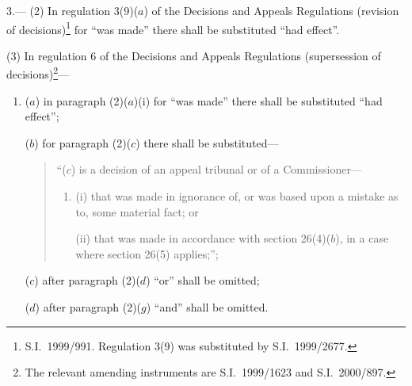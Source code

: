\documentclass[12pt,a4paper]{article}
\begin{document}
3.---%
%
%
(2) In regulation 3(9)($a$)  of the Decisions and Appeals Regulations (revision of decisions)\footnote{S.I.\ 1999/991. Regulation 3(9) was substituted by S.I.\ 1999/2677.} for “was made” there shall be substituted “had effect”.

(3) In regulation 6 of the Decisions and Appeals Regulations (supersession of decisions)\footnote{The relevant amending instruments are S.I.\ 1999/1623 and S.I.\ 2000/897.}—
\begin{enumerate}\item[]
($a$) in paragraph (2)($a$)(i)  for “was made” there shall be substituted “had effect”;

($b$) for paragraph (2)($c$)  there shall be substituted—
\begin{quotation}
“($c$) is a decision of an appeal tribunal or of a Commissioner—
\begin{enumerate}\item[]
(i) that was made in ignorance of, or was based upon a mistake as to, some material fact; or

(ii) that was made in accordance with section 26(4)($b$), in a case where section 26(5) applies;”;
\end{enumerate}
\end{quotation}

($c$) after paragraph (2)($d$)  “or” shall be omitted;

($d$) after paragraph (2)($g$)  “and” shall be omitted.
\end{enumerate}
\end{document}

